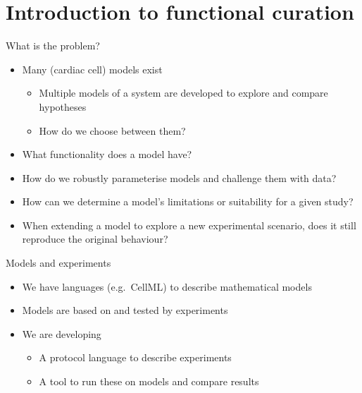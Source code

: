 \documentclass[t,xcolor={usenames,dvipsnames}]{beamer}
\begin{document}
\section{Introduction to functional curation}

\begin{frame}{What is the problem?}
\begin{itemize}
\item Many (cardiac cell) models exist
  \begin{itemize}
  \item Multiple models of a system are developed to explore and compare hypotheses
  \item How do we choose between them?
  \end{itemize}
\item What functionality does a model have?
\item How do we robustly parameterise models and challenge them with data?
\item How can we determine a model's limitations or suitability for a given study?
\item When extending a model to explore a new experimental scenario, does it still reproduce the original behaviour?
\end{itemize}
\end{frame}

\begin{frame}{Models and experiments}
\begin{itemize}
\item We have languages (e.g.\ CellML) to describe mathematical models
\item Models are based on and tested by \alert{experiments}
\item We are developing
  \begin{itemize}
  \item A \alert{protocol language} to describe experiments
  \item A tool to run these on models and compare results
  \end{itemize}
\end{itemize}
\end{frame}
\end{document}
